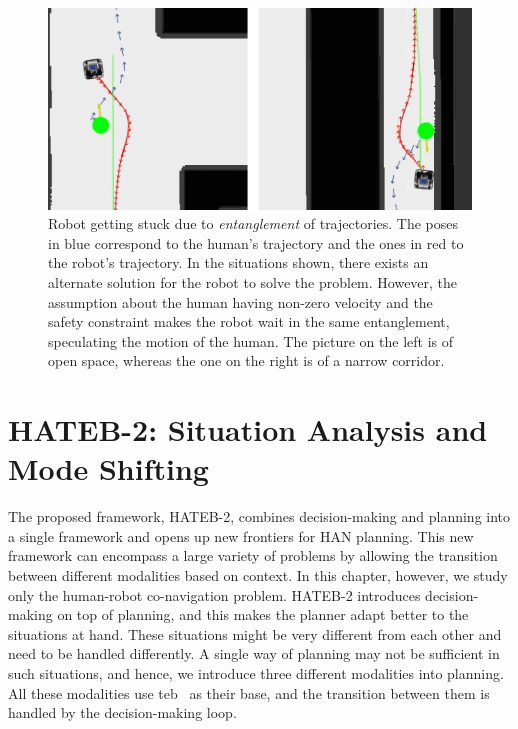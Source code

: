 \begin{figure}[!h]
\centering
\includegraphics[width=0.9\columnwidth]{images/chapter3/entanglement_cut.png}
\caption{Robot getting stuck due to \textit{entanglement} of trajectories. The poses in blue correspond to the human's trajectory and the ones in red to the robot's trajectory. In the situations shown, there exists an alternate solution for the robot to solve the problem. However, the assumption about the human having non-zero velocity and the safety constraint makes the robot wait in the same entanglement, speculating the motion of the human. The picture on the left is of open space, whereas the one on the right is of a narrow corridor.}
\label{stuck}
\end{figure}

\section{HATEB-2: Situation Analysis and Mode Shifting}\label{SA_mode}
The proposed framework, HATEB-2, combines decision-making and planning into a single framework and opens up new frontiers for HAN planning. This new framework can encompass a large variety of problems by allowing the transition between different modalities based on context. In this chapter, however, we study only the human-robot co-navigation problem. HATEB-2 introduces decision-making on top of planning, and this makes the planner adapt better to the situations at hand. These situations might be very different from each other and need to be handled differently. A single way of planning may not be sufficient in such situations, and hence, we introduce three different modalities into planning. All these modalities use \acrfull{teb}~\cite{rosmann2013efficient} as their base, and the transition between them is handled by the decision-making loop.

